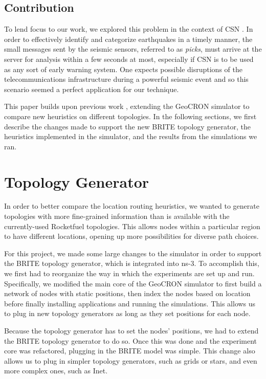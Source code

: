 \documentclass[conference]{IEEEtran}
\begin{document}
\subsection{Contribution}
To lend focus to our work, we explored this problem in the context of CSN \cite{csn_site}.
In order to effectively identify and categorize earthquakes in a timely manner, the small messages sent by the seismic sensors, referred to as \emph{picks}, must arrive at the server for analysis within a few seconds at most, especially if CSN is to be used as any sort of early warning system.
One expects possible disruptions of the telecommunications infrastructure during a powerful seismic event and so this scenario seemed a perfect application for our technique.

This paper builds upon previous work \cite{Benson2013}, extending the GeoCRON simulator to compare new heuristics on different topologies.
In the following sections, we first describe the changes made to support the new BRITE topology generator, the heuristics implemented in the simulator, and the results from the simulations we ran.


\section{Topology Generator}

In order to better compare the location routing heuristics, we wanted to generate topologies with more fine-grained information than is available with the currently-used Rocketfuel topologies.
This allows nodes within a particular region to have different locations, opening up more possibilities for diverse path choices.

For this project, we made some large changes to the simulator in order to support the BRITE \cite{brite} topology generator, which is integrated into ns-3.
To accomplish this, we first had to reorganize the way in which the experiments are set up and run.
Specifically, we modified the main core of the GeoCRON simulator to first build a network of nodes with static positions, then index the nodes based on location before finally installing applications and running the simulations.
This allows us to plug in new topology generators as long as they set positions for each node.

Because the topology generator has to set the nodes' positions, we had to extend the BRITE topology generator to do so.
Once this was done and the experiment core was refactored, plugging in the BRITE model was simple.
This change also allows us to plug in simpler topology generators, such as grids or stars, and even more complex ones, such as Inet.
\end{document}
